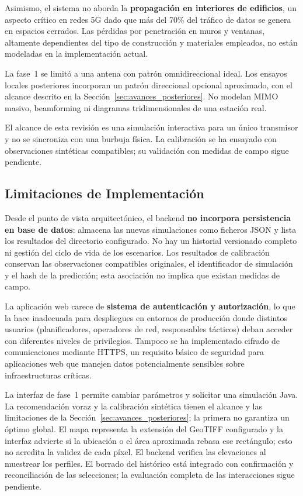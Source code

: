 Asimismo, el sistema no aborda la \textbf{propagación en interiores de edificios}, un aspecto crítico en redes 5G dado que más del 70\% del tráfico de datos se genera en espacios cerrados. Las pérdidas por penetración en muros y ventanas, altamente dependientes del tipo de construcción y materiales empleados, no están modeladas en la implementación actual.

La fase~1 se limitó a una antena con patrón omnidireccional ideal. Los ensayos locales
posteriores incorporan un patrón direccional opcional aproximado, con el alcance descrito
en la Sección~\ref{sec:avances_posteriores}. No modelan MIMO masivo, beamforming ni
diagramas tridimensionales de una estación real.

El alcance de esta revisión es una simulación interactiva para un único transmisor y no
se sincroniza con una burbuja física. La calibración se ha ensayado con observaciones
sintéticas compatibles; su validación con medidas de campo sigue pendiente.

\subsection*{Limitaciones de Implementación}

Desde el punto de vista arquitectónico, el backend \textbf{no incorpora persistencia en base de
datos}: almacena las nuevas simulaciones como ficheros JSON y lista los resultados del
directorio configurado. No hay un historial versionado completo ni gestión del ciclo
de vida de los escenarios. Los resultados de calibración conservan las observaciones
compatibles originales, el identificador de simulación y el hash de la predicción;
esta asociación no implica que existan medidas de campo.

La aplicación web carece de \textbf{sistema de autenticación y autorización}, lo que la hace inadecuada para despliegues en entornos de producción donde distintos usuarios (planificadores, operadores de red, responsables tácticos) deban acceder con diferentes niveles de privilegios. Tampoco se ha implementado cifrado de comunicaciones mediante HTTPS, un requisito básico de seguridad para aplicaciones web que manejen datos potencialmente sensibles sobre infraestructuras críticas.

La interfaz de fase~1 permite cambiar parámetros y solicitar una simulación Java. La
recomendación voraz y la calibración sintética tienen el alcance y las limitaciones de
la Sección~\ref{sec:avances_posteriores}; la primera no garantiza un óptimo global.
El mapa representa la extensión del GeoTIFF configurado y la interfaz advierte si la
ubicación o el área aproximada rebasa ese rectángulo; esto no acredita la validez de cada
píxel. El backend verifica las elevaciones al muestrear los perfiles. El borrado del
histórico está integrado con confirmación y reconciliación de las selecciones; la
evaluación completa de las interacciones sigue pendiente.

